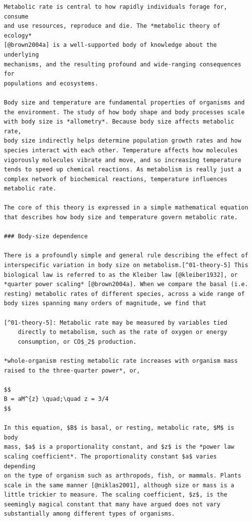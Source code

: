 \documentclass[
  10pt,
  letterpaper,
  nols]{tufte-book}
\begin{document}
\begin{verbatim}
Metabolic rate is central to how rapidly individuals forage for, consume
and use resources, reproduce and die. The *metabolic theory of ecology*
[@brown2004a] is a well-supported body of knowledge about the underlying
mechanisms, and the resulting profound and wide-ranging consequences for
populations and ecosystems.

Body size and temperature are fundamental properties of organisms and
the environment. The study of how body shape and body processes scale
with body size is *allometry*. Because body size affects metabolic rate,
body size indirectly helps determine population growth rates and how
species interact with each other. Temperature affects how molecules
vigorously molecules vibrate and move, and so increasing temperature
tends to speed up chemical reactions. As metabolism is really just a
complex network of biochemical reactions, temperature influences
metabolic rate.

The core of this theory is expressed in a simple mathematical equation
that describes how body size and temperature govern metabolic rate.

### Body-size dependence

There is a profoundly simple and general rule describing the effect of
interspecific variation in body size on metabolism.[^01-theory-5] This
biological law is referred to as the Kleiber law [@kleiber1932], or
*quarter power scaling* [@brown2004a]. When we compare the basal (i.e.
resting) metabolic rates of different species, across a wide range of
body sizes spanning many orders of magnitude, we find that

[^01-theory-5]: Metabolic rate may be measured by variables tied
    directly to metabolism, such as the rate of oxygen or energy
    consumption, or CO$_2$ production.

*whole-organism resting metabolic rate increases with organism mass
raised to the three-quarter power*, or,

$$
B = aM^{z} \quad;\quad z = 3/4
$$

In this equation, $B$ is basal, or resting, metabolic rate, $M$ is body
mass, $a$ is a proportionality constant, and $z$ is the *power law
scaling coefficient*. The proportionality constant $a$ varies depending
on the type of organism such as arthropods, fish, or mammals. Plants
scale in the same manner [@niklas2001], although size or mass is a
little trickier to measure. The scaling coefficient, $z$, is the
seemingly magical constant that many have argued does not vary
substantially among different types of organisms.


\end{verbatim}
\end{document}
